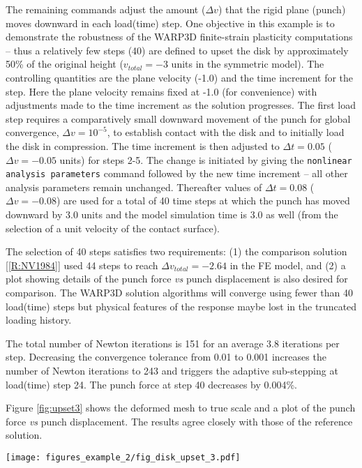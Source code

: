 \documentclass[11pt]{report}
\numberwithin{equation}{section}
\newcommand{\ttt} {\texttt}  %
\newcommand{\ti}{\emph}
\renewcommand{\thefigure}{\thesection.\arabic{figure}}
\begin{document}
{The remaining commands adjust the amount ($\Delta v$) that the rigid plane (punch) moves
downward  in each
load(time) step. One objective in this example is to demonstrate the robustness of the WARP3D finite-strain
plasticity computations -- thus a relatively few steps (40) are defined to upset the disk by approximately
50\% of the original height ($v_{total} =-3$ units in the symmetric model). The controlling
quantities are the plane velocity (-1.0) and the time increment for the step. Here the plane velocity remains
fixed at -1.0 (for convenience) with adjustments made to the time increment as the solution
progresses.
The first load step requires a comparatively small downward movement of the punch for
global convergence, $\Delta v =  10^{-5}$, to establish
contact with the disk and to initially load the disk in compression. The time increment 
is then adjusted to $\Delta t = 0.05$
($\Delta v =  -0.05$ units) for steps 2-5. The change is initiated by giving
the \ttt{nonlinear analysis parameters} command followed by the new
time increment -- all other analysis parameters remain unchanged.
Thereafter values of $\Delta t = 0.08$
($\Delta v =  -0.08$) are used for a total of 40 time steps at which the punch has moved
downward by 3.0 units and the model simulation time is 3.0 as well (from the selection of
a unit velocity of the contact surface). 

The selection of 40 steps satisfies two requirements: (1) the comparison solution 
[\ref{R:NV1984}] used 44 steps to reach 
$\Delta v_{total}=-2.64$ in the FE model, and (2) a plot showing details of the punch 
force \ti{vs} punch displacement is also
desired for comparison. The WARP3D solution algorithms will converge using
fewer than 40 load(time) steps but physical features of the
response maybe lost in the truncated loading history.

The total number of Newton iterations is 151 for an average 3.8 iterations per step. 
Decreasing the convergence tolerance from 0.01 to 0.001 increases the number
of Newton iterations to 243 and triggers the adaptive sub-stepping at load(time) step 24.
The punch force at step 40 decreases by 0.004\%.

Figure \ref{fig:upset3} shows the deformed mesh to true scale and a plot of the punch force
\ti{vs}
punch displacement. The results agree closely with those of the reference solution.

%
\begin{sidewaysfigure}
\begin{center}
\texttt{[image: figures\_example\_2/fig\_disk\_upset\_3.pdf]} 
\caption{{\small Fig. \thefigure\ Disk upsetting analysis. (a) comparison of predicted
punch force with punch displacement; WARP3D and reference solution, (b) deformed mesh
at step 40 to true scale and distribution of mises equivalent stress }
\label{fig:upset3}}
%
\end{center}
\end{sidewaysfigure}
%

}
\end{document}
